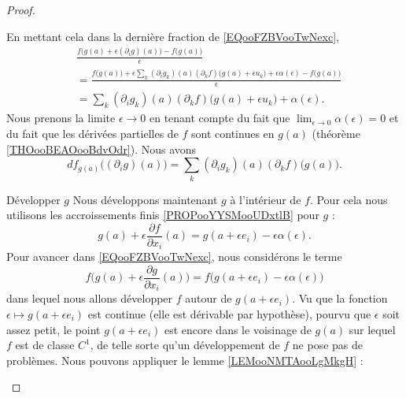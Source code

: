 \begin{proof}
\begin{subproof}
            En mettant cela dans la dernière fraction de \eqref{EQooFZBVooTwNexc},
            \begin{subequations}
                \begin{align}
                    &\frac{ f\big( g(a)+\epsilon(\partial_ig)(a) \big)-f\big( g(a) \big) }{ \epsilon }\\
                    &=\frac{ f\big( g(a) \big)  +\epsilon\sum_k(\partial_ig_k)(a)(\partial_kf)\big(g(a)+\epsilon u_k\big)+\epsilon\alpha(\epsilon)-f\big( g(a) \big)   }{ \epsilon }\\
                    &=\sum_k(\partial_ig_k)(a)(\partial_kf)\big( g(a)+\epsilon u_k\big)+\alpha(\epsilon).
                \end{align}
            \end{subequations}
            Nous prenons la limite \( \epsilon\to 0\) en tenant compte du fait que \( \lim_{\epsilon\to 0}\alpha(\epsilon)=0\) et du fait que les dérivées partielles de \( f\) sont continues en \( g(a)\) (théorème \ref{THOooBEAOooBdvOdr}). Nous avons
            \begin{equation}
                df_{g(a)}\big( (\partial_ig)(a) \big)=\sum_k(\partial_ig_k)(a)(\partial_kf)\big( g(a) \big).
            \end{equation}
        \item[Développer \( g\)]
            Nous développons maintenant \( g\) à l'intérieur de \( f\). Pour cela nous utilisons les accroissements finis \ref{PROPooYYSMooUDxtlB} pour \( g\) :
            \begin{equation}
                g(a)+\epsilon\frac{ \partial f }{ \partial x_i }(a)=g(a+\epsilon e_i)-\epsilon\alpha(\epsilon).
            \end{equation}
            Pour avancer dans \eqref{EQooFZBVooTwNexc}, nous considérons le terme
            \begin{equation}
         f\big( g(a)+\epsilon\frac{ \partial g }{ \partial x_i }(a) \big)=
                f\big( g(a+\epsilon e_i)-\epsilon \alpha(\epsilon) \big)
            \end{equation}
            dans lequel nous allons développer \( f\) autour de \( g(a+\epsilon e_i)\). Vu que la fonction \( \epsilon\mapsto g(a+\epsilon e_i)\) est continue (elle est dérivable par hypothèse), pourvu que \( \epsilon\) soit assez petit, le point \( g(a+\epsilon e_i)\) est encore dans le voisinage de \( g(a)\) sur lequel \( f\) est de classe \( C^1\), de telle sorte qu'un développement de \( f\) ne pose pas de problèmes. Nous pouvons appliquer le lemme \eqref{LEMooNMTAooLgMkgH} : 

\end{subproof}
\end{proof}
